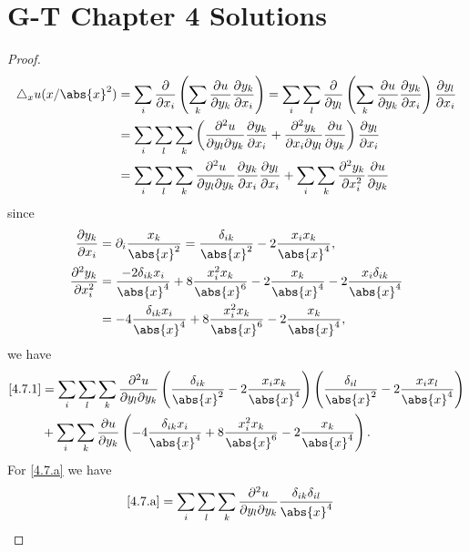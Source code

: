 \documentclass[a4paper]{article}
\newcommand*\Laplace{\mathop{}\!\mathbin\bigtriangleup}
\DeclarePairedDelimiter{\abs}\lvert\rvert
\begin{document}
\section{G-T Chapter 4 Solutions}
\setcounter{proof}{6}
\begin{proof}
\begin{equation}\label{4.7.1}
\begin{split}
\Laplace_x u(x/\abs{x}^2)
&= \sum_i \frac{\partial}{\partial x_i}\left(\sum_k\frac{\partial u}{\partial y_k}\frac{\partial y_k}{\partial x_i}\right)
= \sum_i\sum_l\frac{\partial}{\partial y_l}\left(\sum_k\frac{\partial u}{\partial y_k}\frac{\partial y_k}{\partial x_i}\right)
\frac{\partial y_l}{\partial x_i} \\
&= \sum_i\sum_l\sum_k\left(\frac{\partial^2 u}{\partial y_l\partial y_k}\frac{\partial y_k}{\partial x_i}
+\frac{\partial^2 y_k}{\partial x_i\partial y_l}\frac{\partial u}{\partial y_k}\right)\frac{\partial y_l}{\partial x_i} \\
&= \sum_i\sum_l\sum_k\frac{\partial^2 u}{\partial y_l\partial y_k}\frac{\partial y_k}{\partial x_i}
\frac{\partial y_l}{\partial x_i} + \sum_i\sum_k\frac{\partial^2 y_k}{\partial x_i^2}\frac{\partial u}{\partial y_k}
\end{split}
\end{equation}
since
\begin{align*}
\frac{\partial y_k}{\partial x_i} &= \partial_i \frac{x_k}{\abs{x}^2}
= \frac{\delta_{ik}}{\abs{x}^2} - 2\frac{x_ix_k}{\abs{x}^4}, \\
\frac{\partial^2 y_k}{\partial x_i^2}
&= \frac{-2\delta_{ik}x_i}{\abs{x}^4} + 8\frac{x_i^2x_k}{\abs{x}^6}
- 2\frac{x_k}{\abs{x}^4} - 2\frac{x_i\delta_{ik}}{\abs{x}^4} \\
&= -4\frac{\delta_{ik}x_i}{\abs{x}^4} + 8\frac{x_i^2x_k}{\abs{x}^6} - 2\frac{x_k}{\abs{x}^4},
\end{align*}
we have
\begin{align}
\eqref{4.7.1} &= \sum_i\sum_l\sum_k\frac{\partial^2 u}{\partial y_l\partial y_k}
\left(\frac{\delta_{ik}}{\abs{x}^2} - 2\frac{x_ix_k}{\abs{x}^4}\right)
\left(\frac{\delta_{il}}{\abs{x}^2} - 2\frac{x_ix_l}{\abs{x}^4}\right) \label{4.7.a} \\
&+ \sum_i\sum_k\frac{\partial u}{\partial y_k}\left(-4\frac{\delta_{ik}x_i}{\abs{x}^4}
+ 8\frac{x_i^2x_k}{\abs{x}^6} - 2\frac{x_k}{\abs{x}^4}\right) \label{4.7.b}.
\end{align}
For \eqref{4.7.a} we have
\begin{align*}
\eqref{4.7.a} &= \sum_i\sum_l\sum_k\frac{\partial^2 u}{\partial y_l\partial y_k}\frac{\delta_{ik}\delta_{il}}{\abs{x}^4}

\end{align*}
\end{proof}
\end{document}
